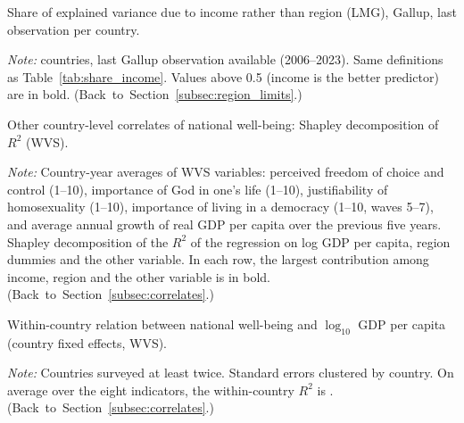 \documentclass[12pt]{article}
\begin{document}
\begin{table}[htbp]
    \centering
    \caption{Share of explained variance due to income rather than region (LMG), Gallup, last observation per country.}\label{tab:share_gallup}
    \begin{adjustbox}{max width=\textwidth}
    
    \end{adjustbox}
    \begin{minipage}{\textwidth}\footnotesize \textit{Note:} \nGallupCountries countries, last Gallup observation available (2006--2023). Same definitions as Table~\ref{tab:share_income}. Values above 0.5 (income is the better predictor) are in bold. \hfill(Back~to~Section~\ref{subsec:region_limits}.)\end{minipage}
\end{table} %

\begin{table}[htbp]
    \centering
    \caption{Other country-level correlates of national well-being: Shapley decomposition of $R^2$ (WVS).}\label{tab:correlates}
    \begin{adjustbox}{max width=\textwidth}
    
    \end{adjustbox}
    \begin{minipage}{\textwidth}\footnotesize \textit{Note:} Country-year averages of WVS variables: perceived freedom of choice and control (1--10), importance of God in one's life (1--10), justifiability of homosexuality (1--10), importance of living in a democracy (1--10, waves 5--7), and average annual growth of real GDP per capita over the previous five years. Shapley decomposition of the $R^2$ of the regression on log GDP per capita, region dummies and the other variable. In each row, the largest contribution among income, region and the other variable is in bold. \hfill(Back~to~Section~\ref{subsec:correlates}.)\end{minipage}
\end{table}

\begin{table}[htbp]
    \centering
    \caption{Within-country relation between national well-being and $\log_{10}$ GDP per capita (country fixed effects, WVS).}\label{tab:within}
    \begin{adjustbox}{max width=\textwidth}
    
    \end{adjustbox}
    \begin{minipage}{\textwidth}\footnotesize \textit{Note:} Countries surveyed at least twice. Standard errors clustered by country. On average over the eight indicators, the within-country $R^2$ is \meanWithinRtwo. \hfill(Back~to~Section~\ref{subsec:correlates}.)\end{minipage}
\end{table}
\end{document}
